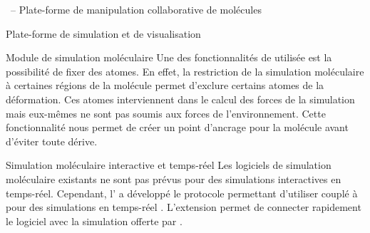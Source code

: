 \documentclass[myfrancais,ngerman,english,frenchb]{mythesis}
\begin{document}
\begin{mychapter}{\myShaddock\ -- Plate-forme de manipulation collaborative de molécules}
\begin{mysection}{Plate-forme de simulation et de visualisation}
\begin{mysubsection}{Module de simulation moléculaire}
				Une des fonctionnalités de  utilisée est la possibilité de \og fixer \fg des atomes.
				En effet, la restriction de la simulation moléculaire à certaines régions de la molécule permet d'exclure certains atomes de la déformation.
				Ces atomes interviennent dans le calcul des forces de la simulation mais eux-mêmes ne sont pas soumis aux forces de l'environnement.
				Cette fonctionnalité nous permet de créer un point d'ancrage pour la molécule avant d'éviter toute dérive.
				\begin{mysubsubsection}{Simulation moléculaire interactive et temps-réel}
					Les logiciels de simulation moléculaire existants ne sont pas prévus pour des simulations interactives en temps-réel.
					Cependant, l' a développé le protocole  permettant d'utiliser  couplé à  pour des simulations en temps-réel .
					L'extension  permet de connecter rapidement le logiciel  avec la simulation offerte par .


\end{mysubsubsection}
\end{mysubsection}
\end{mysection}
\end{mychapter}
\end{document}

